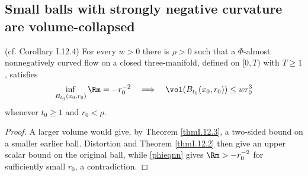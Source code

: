 \subsection{Small balls with strongly negative curvature are volume-collapsed}
\label{I.12.4}
\begin{corollary}
\label{cor:kl-small-balls-strongly-negative-curvature-volume-collapsed-positivity-curvature}

(cf. Corollary I.12.4) \label{corI.12.4}
For every $w>0$ there is $\rho>0$ such that a $\Phi$-almost nonnegatively
curved flow on a closed three-manifold, defined on $[0,T)$ with $T\geq1$,
satisfies
\[
\inf_{B_{t_0}(x_0,r_0)}\Rm=-r_0^{-2}
\quad\Longrightarrow\quad
\vol(B_{t_0}(x_0,r_0))\leq wr_0^3
\]
whenever $t_0\geq1$ and $r_0<\rho$.
\end{corollary}
\begin{proof}
\sketch A larger volume would give, by Theorem \ref{thmI.12.3}, a
two-sided bound on a smaller earlier ball.  Distortion and Theorem
\ref{thmI.12.2} then give an upper scalar bound on the original ball, while
\eqref{phieqnn} gives $\Rm> -r_0^{-2}$ for sufficiently small $r_0$, a
contradiction.
\end{proof}

